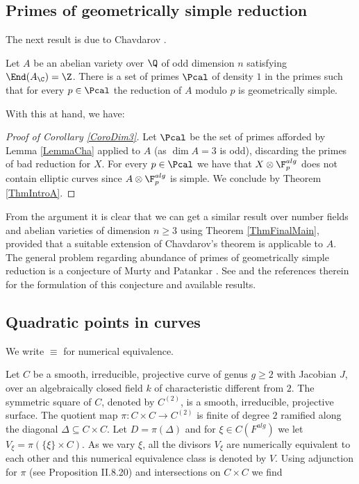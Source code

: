 
\subsection{Primes of geometrically simple reduction} \label{SecApp2} The next result is due to Chavdarov \cite{Chavdarov}.
\begin{lemma}
\notready\label{LemmaCha} Let $A$ be an abelian variety over $\Q$ of odd dimension $n$ satisfying $\End (A_\C)=\Z$. There is a set of primes $\Pcal$ of density $1$ in the primes such that for every $p\in \Pcal$ the reduction of $A$ modulo $p$ is geometrically simple.
\end{lemma}
With this at hand, we have:

\begin{proof}[Proof of Corollary \ref{CoroDim3}] Let $\Pcal$ be the set of primes afforded by Lemma \ref{LemmaCha} applied to $A$ (as $\dim A=3$ is odd), discarding the primes of bad reduction for $X$. For every $p\in \Pcal$ we have that $X\otimes \F_p^{alg}$ does not contain elliptic curves since $A\otimes \F_p^{alg}$ is simple. We conclude by Theorem \ref{ThmIntroA}.
\end{proof}

From the argument it is clear that we can get a similar result over number fields and abelian varieties of dimension $n\ge 3$ using Theorem \ref{ThmFinalMain}, provided that a suitable extension of Chavdarov's theorem is applicable to $A$. The general problem regarding abundance of primes of geometrically simple reduction is a conjecture of Murty and Patankar \cite{MurtyPatankar}. See \cite{Zywina} and the references therein for the formulation of this conjecture and available results.


\subsection{Quadratic points in curves} \label{SecApp3} We write $\equiv$ for numerical equivalence.

Let $C$ be a smooth,  irreducible, projective curve of genus $g\ge 2$ with Jacobian $J$, over an algebraically closed field $k$ of characteristic different from $2$. The symmetric square of $C$,  denoted by $C^{(2)}$, is a smooth, irreducible, projective surface. The quotient map $\pi:C\times C\to C^{(2)}$ is finite of degree $2$ ramified along the diagonal $\Delta\subseteq C\times C$. Let $D=\pi(\Delta)$ and for $\xi \in C(F^{alg})$ we let $V_\xi=\pi(\{\xi\}\times C)$. As we vary $\xi$, all the divisors $V_\xi$ are numerically equivalent to each other and this numerical equivalence class  is denoted by $V$.  Using adjunction for $\pi$ (see \cite{Hartshorne} Proposition II.8.20) and intersections on $C\times C$ we find


